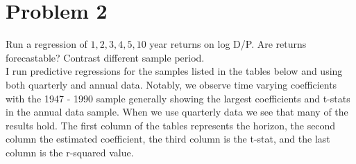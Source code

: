 \documentclass[11pt,letter]{article}
\begin{document}
\section*{Problem 2}
Run a regression of $1, 2, 3, 4, 5, 10$ year returns on log D/P. Are returns forecastable? Contrast different sample period. \\
I run predictive regressions for the samples listed in the tables below and using both quarterly and annual data. Notably, we observe time varying coefficients with the 1947 - 1990 sample generally showing the largest coefficients and t-stats in the annual data sample. When we use quarterly data we see that many of the results hold. The first column of the tables represents the horizon, the second column the estimated coefficient, the third column is the t-stat, and the last column is the r-squared value. 
\end{document}
